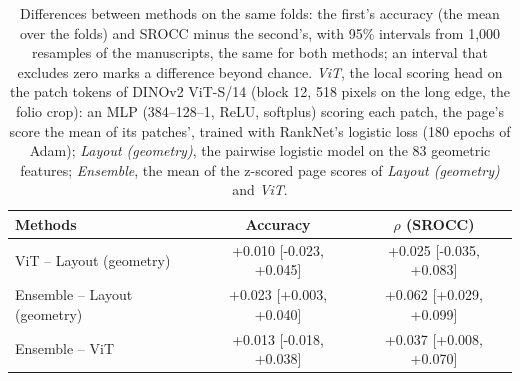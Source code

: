\begin{table}[htbp]
  \centering
  \caption{Differences between methods on the same folds: the first's accuracy (the mean over the folds) and SROCC minus the second's, with 95\% intervals from 1,000 resamples of the manuscripts, the same for both methods; an interval that excludes zero marks a difference beyond chance. \emph{ViT}, the local scoring head on the patch tokens of DINOv2 ViT-S/14 (block 12, 518 pixels on the long edge, the folio crop): an MLP (384--128--1, ReLU, softplus) scoring each patch, the page's score the mean of its patches', trained with RankNet's logistic loss (180 epochs of Adam); \emph{Layout (geometry)}, the pairwise logistic model on the 83 geometric features; \emph{Ensemble}, the mean of the z-scored page scores of \emph{Layout (geometry)} and \emph{ViT}.}
  \label{tab:paired_differences}
  \begin{tabular}{lcc}
    \toprule
    Methods & Accuracy & $\rho$ (SROCC) \\
    \midrule
    ViT -- Layout (geometry) & +0.010 [-0.023, +0.045] & +0.025 [-0.035, +0.083] \\
    Ensemble -- Layout (geometry) & +0.023 [+0.003, +0.040] & +0.062 [+0.029, +0.099] \\
    Ensemble -- ViT & +0.013 [-0.018, +0.038] & +0.037 [+0.008, +0.070] \\
    \bottomrule
  \end{tabular}
\end{table}
